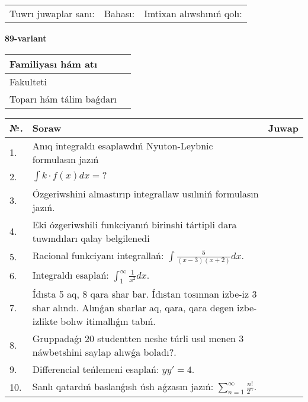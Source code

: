 \documentclass{article}
\begin{document}
\vspace{1cm}

\begin{tabular}{ c c c }
Tuwrı juwaplar sanı: \underline{\hspace{2cm}} & Bahası: \underline{\hspace{2cm}} & Imtixan alıwshınıń qolı: \underline{\hspace{2cm}} \\
\end{tabular}

\newpage

\begin{center}\textbf{89-variant}\end{center}

\bgroup
\def\arraystretch{1.5}
\begin{tabular}{ |m{6cm}|m{10cm}| }
  \hline
  Familiyası hám atı & \\
  \hline
  Fakulteti &\\
  \hline
  Toparı hám tálim baǵdarı & \\
  \hline
\end{tabular}
\egroup

\vspace{0.5cm}

\bgroup
\def\arraystretch{2}
\begin{tabular}{ |l|m{8cm}|m{7cm}| }
  \hline
  №. & Soraw & Juwap \\
  \hline
  1. & Anıq integraldı esaplawdıń Nyuton-Leybnic formulasın jazıń &  \\
  \hline
  2. & $\displaystyle\int k \cdot f(x)dx = ?$ &  \\
  \hline
  3. & Ózgeriwshini almastırıp integrallaw usılıniń formulasın jazıń. &  \\
  \hline
  4. & Eki ózgeriwshili funkciyanıń birinshi tártipli dara tuwındıları qalay belgilenedi &  \\
  \hline
  5. & Racional funkciyanı integrallań: $\displaystyle\int {\frac{5}{(x - 3)(x + 2)}dx}$. &  \\
  \hline
  6. & Integraldı esaplań: $\displaystyle\int_{1}^{\infty}{\frac{1}{x^{2}}dx}$. &  \\
  \hline
  7. & Ídısta 5 aq, 8 qara shar bar. Ídıstan tosınnan izbe-iz 3 shar alındı. Alınǵan sharlar aq, qara, qara degen izbe-izlikte bolıw itimallıǵın tabıń. &  \\
  \hline
  8. & Gruppadaǵı 20 studentten neshe túrli usıl menen 3 náwbetshini saylap alıwǵa boladı?. &  \\
  \hline
  9. & Differencial teńlemeni esaplań: $yy'= 4$. &  \\
  \hline
  10. & Sanlı qatardıń baslanǵısh úsh aǵzasın jazıń: $\displaystyle\sum_{n = 1}^{\infty}\frac{n!}{2^{n}}$. &  \\
  \hline
\end{tabular}
\egroup
\end{document}
